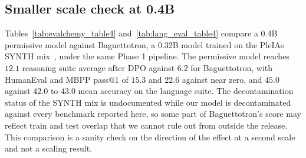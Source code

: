 \subsection{Smaller scale check at 0.4B}
\label{app:smallscale}

Tables~\ref{tab:evalchemy_table4} and~\ref{tab:lang_eval_table4} compare a 0.4B permissive
model against Baguettotron, a 0.32B model trained on the PleIAs SYNTH
mix~\citep{synthpleias2025}, under the same Phase 1 pipeline. The permissive model reaches $12.1$ reasoning suite average after DPO against $6.2$ for Baguettotron, with HumanEval and
MBPP pass@1 of $15.3$ and $22.6$ against near zero, and $45.0$ against $42.0$ to $43.0$
mean accuracy on the language suite. The decontamination status of the SYNTH mix is
undocumented while our model is decontaminated against every benchmark reported here, so
some part of Baguettotron's score may reflect train and test overlap that we cannot rule
out from outside the release. This comparison is a sanity check on the direction of the
effect at a second scale and not a scaling result.




